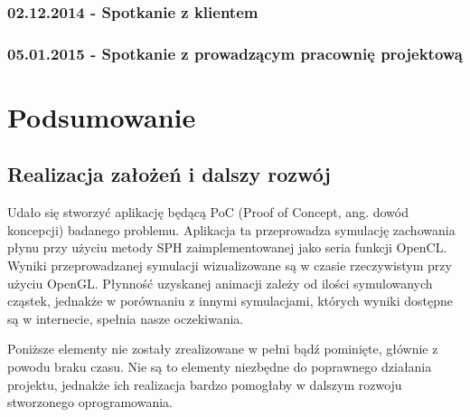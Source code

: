 \documentclass[polish, 12pt]{aghthesis}
\begin{document}
		\subsubsection*{02.12.2014 - Spotkanie z klientem}
			
		\subsubsection*{05.01.2015 - Spotkanie z prowadzącym pracownię projektową}

\section{Podsumowanie}

	\subsection{Realizacja założeń i dalszy rozwój}
	
		Udało się stworzyć aplikację będącą PoC (Proof of Concept, ang. dowód koncepcji) badanego problemu. Aplikacja ta przeprowadza symulację zachowania płynu przy użyciu metody SPH zaimplementowanej jako seria funkcji OpenCL. Wyniki przeprowadzanej symulacji wizualizowane są w czasie rzeczywistym przy użyciu OpenGL. Płynność uzyskanej animacji zależy od ilości symulowanych cząstek, jednakże w porównaniu z innymi symulacjami, których wyniki dostępne są w internecie, spełnia nasze oczekiwania.
		
		Poniższe elementy nie zostały zrealizowane w pełni bądź pominięte, głównie z powodu braku czasu. Nie są to elementy niezbędne do poprawnego działania projektu, jednakże ich realizacja bardzo pomogłaby w dalszym rozwoju stworzonego oprogramowania.
		
\end{document}
